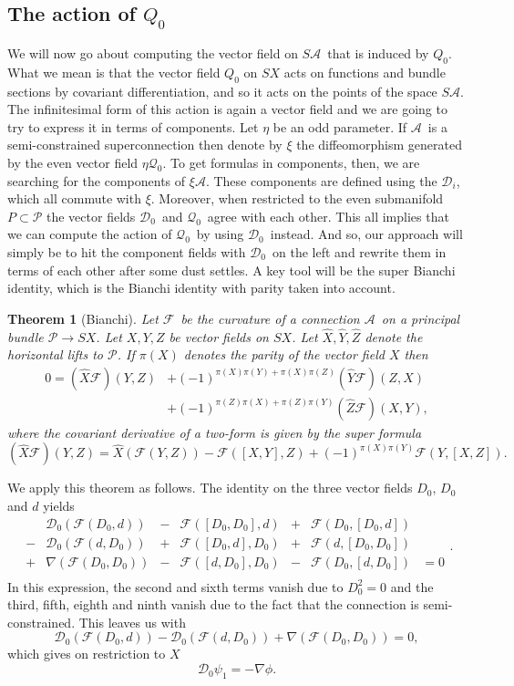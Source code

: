 \documentclass[twoside]{amsart}
\newcommand{\mytexorpdfstring}[2]{\texorpdfstring{#1}{#2}}
\newtheorem{theorem}{Theorem}
\newcommand{\enm}[1]{\ensuremath{#1}}
\renewcommand{\aa}{\enm{\mathcal{A}}}
\newcommand{\sa}{\enm{S\aa}}
\newcommand{\pp}{\enm{\mathcal{P}}}
\newcommand{\nab}{\enm{\nabla}}
\newcommand{\dzc}{\enm{\mathcal{D}_{0}}}
\newcommand{\qzc}{\enm{\mathcal{Q}_{0}}}
\newcommand{\ff}{\enm{\mathcal{F}}}
\newcommand{\bianchioddoddeven}[6]{
    \begin{array}{ccccccc}
           & {#4}(\ff({#2}, {#3}))& - &
             \ff([{#1},{#2}], {#3}) & + &
             \ff({#2}, [{#1},{#3}]) & \\
        - & {#5}(\ff({#3}, {#1}))& + &
             \ff([{#2},{#3}], {#1}) & + &
             \ff({#3}, [{#2},{#1}]) & \\
        + & {#6}(\ff({#1}, {#2}))& - &
             \ff([{#3},{#1}], {#2}) & - &
             \ff({#1}, [{#3},{#2}]) & =0\\
    \end{array}
}
\begin{document}
\subsection{The action of \mytexorpdfstring{$Q_{0}$}{Q0}}

\label{sec:actionofq0}
We will now go about computing the vector field on \sa\ that is
induced by \( Q_0 \).  What we mean is that the vector field \( Q_0 \)
on \( SX \) acts on functions and bundle sections by covariant
differentiation, and so it acts on the points of the space \sa.  The
infinitesimal form of this action is again a vector field and we are
going to try to express it in terms of components.  Let \( \eta \) be
an odd parameter.  If \aa\ is a semi-constrained superconnection then
denote by \( \xi \) the diffeomorphism generated by the even vector
field \( \eta\qzc \).  To get formulas in components, then, we are
searching for the components of \( \xi\aa.\) These components are
defined using the \( \mathcal{D}_i \), which all commute with \(\xi\).
Moreover, when restricted to the even submanifold \(P\subset \pp\) the
vector fields \dzc\ and \qzc\ agree with each other.  This all implies
that we can compute the action of \qzc\ by using \dzc\ instead.  And
so, our approach will simply be to hit the component fields with \dzc\
on the left and rewrite them in terms of each other after some dust
settles.  A key tool will be the super Bianchi identity, which
is the Bianchi identity with parity taken into account.
\begin{theorem}[Bianchi]
Let \ff\ be the curvature of a connection \aa\ on a principal bundle
\( \pp\to SX \).  Let \( X, Y, Z \) be vector fields on \( SX \).  Let
\( \hat{X}, \hat{Y}, \hat{Z} \) denote the horizontal lifts to \pp.
If \( \pi(X) \) denotes the parity of the vector field \( X \) then
\begin{align*}
    0=(\hat{X}{\ff})(Y, Z) &+
    (-1)^{\pi(X)\pi(Y)+\pi(X)\pi(Z)}(\hat{Y}{\ff})(Z, X) \\&+
    (-1)^{\pi(Z)\pi(X) + \pi(Z)\pi(Y)}(\hat{Z}{\ff})(X, Y),
\end{align*}
where the covariant derivative of a two-form is given by the super
formula
\[ (\hat{X}{\ff})(Y, Z) =
\hat{X}(\ff(Y, Z)) - \ff([X,Y], Z) + (-1)^{\pi(X)\pi(Y)} \ff(Y,
[X,Z]).\]
\end{theorem}

We apply this theorem as follows.  The identity on the three vector
fields \( D_{0} \), \( D_{0} \) and \( d \) yields
\[
\bianchioddoddeven{D_{0}}{D_{0}}{d}{\dzc}{\dzc}{\nab}.
\]
In this expression, the second and sixth terms vanish due to \(
D_{0}^{2} = 0 \) and the third, fifth, eighth and ninth vanish due to
the fact that the connection is semi-constrained.  This leaves us with
\[ \dzc(\ff(D_{0}, d)) - \dzc(\ff(d, D_{0})) + \nab(\ff(D_{0},
D_{0})) = 0,\]
which gives on restriction to \( X \)
\begin{equation}
    \boxed{\dzc \psi_{1} = -\nab \phi.}
    \label{eq:d0psi1}
\end{equation}
\end{document}

